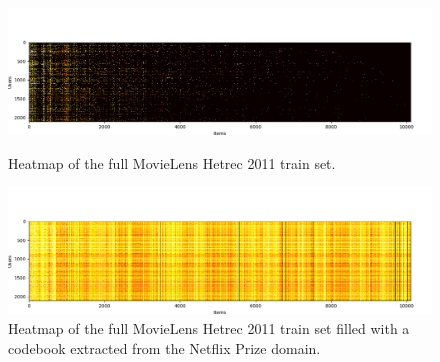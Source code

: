 \begin{figure}[htb]
\centering
\includegraphics[width=\textwidth]{pictures/movielens-full-target}
\caption{Heatmap of the full MovieLens Hetrec 2011 train set.}
\includegraphics[width=\textwidth]{pictures/movielens-full-target-filled}
\caption{Heatmap of the full MovieLens Hetrec 2011 train set filled with a codebook extracted from the Netflix Prize domain.}
\end{figure}


